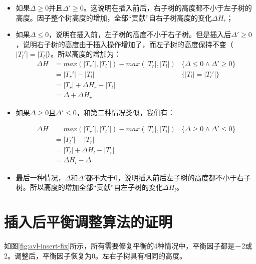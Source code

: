 \documentclass[UTF8]{article}
\begin{document}
\begin{itemize}
\item 如果$\Delta \geq 0$并且$\Delta' \geq 0$。这说明在插入前后，右子树的高度都不小于左子树的高度。因子整个树高度的增加，全部“贡献”自右子树高度的变化$\Delta H_r$；

\item 如果$\Delta \leq 0$，说明在插入前，左子树的高度不小于右子树。但是插入后$\Delta' \geq 0$，说明右子树的高度由于插入操作增加了，而左子树的高度保持不变（$|T_l'|=|T_l|$）。所以高度的增加为：
\[
\begin{array}{rll}
\Delta H & = max(|T_r'|, |T_l'|) - max (|T_r|, |T_l|) & \{\Delta \leq 0 \land \Delta' \geq 0 \}\\
         & = |T_r'|-|T_l| & \{|T_l|=|T_l'| \}\\
         & = |T_r|+\Delta H_r - |T_l| & \\
         & = \Delta + \Delta H_r &
\end{array}
\]

\item 如果$\Delta \geq 0$且$\Delta' \leq 0$，和第二种情况类似，我们有：

\[
\begin{array}{rll}
\Delta H & = max(|T_r'|, |T_l'|) - max (|T_r|, |T_l|) & \{\Delta \geq 0 \land \Delta' \leq 0 \}\\
         & = |T_l'|-|T_r| & \\
         & = |T_l|+\Delta H_l - |T_r| & \\
         & = \Delta H_l - \Delta&
\end{array}
\]

\item 最后一种情况，$\Delta$和$\Delta'$都不大于0，说明插入前后左子树的高度都不小于右子树。所以高度的增加全部“贡献”自左子树的变化$\Delta H_l$。
\end{itemize}

\section{插入后平衡调整算法的证明}

如图\ref{fig:avl-insert-fix}所示，所有需要修复平衡的4种情况中，平衡因子都是－2或2。调整后，平衡因子恢复为0。左右子树具有相同的高度。
\end{document}
